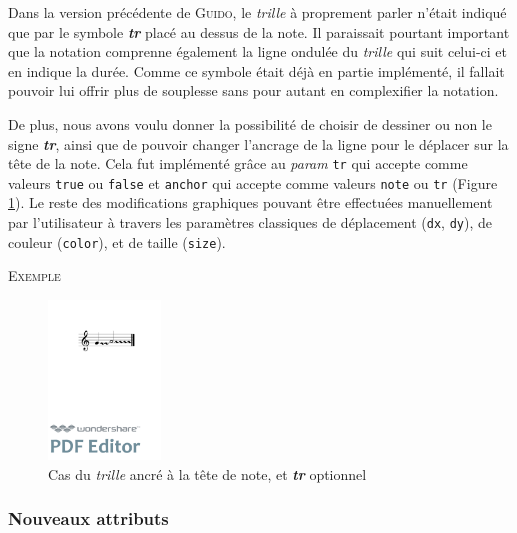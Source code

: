 \documentclass{article}
\newenvironment{gmncode}	{\vspace{-2mm}\small\verbatim}{\endverbatim\vspace{-2mm}}
\newcommand{\guido}			{\textsc{Guido}}
\newcommand{\code}[1]		{{\small \texttt{#1}}}
\newcommand{\exemple}		{\vspace{2mm}\hspace*{-6mm}\textsc{Exemple}}
\begin{document}
Dans la version précédente de \guido{}, le \emph{trille} à proprement parler n'était indiqué que par le symbole \textit{\textbf{tr}} placé au dessus de la note. Il paraissait pourtant important que la notation comprenne également la ligne ondulée du \emph{trille} qui suit celui-ci et en indique la durée. Comme ce symbole était déjà en partie implémenté, il fallait pouvoir lui offrir plus de souplesse sans pour autant en complexifier la notation.


De plus, nous avons voulu donner la possibilité de choisir de dessiner ou non le signe \textit{\textbf{tr}}, ainsi que de pouvoir changer l'ancrage de la ligne pour le déplacer sur la tête de la note. Cela fut implémenté grâce au \emph{param} \code{tr} qui accepte comme valeurs \code{true} ou \code{false} et \code{anchor} qui accepte comme valeurs \code{note} ou \code{tr} (Figure \ref{fig:trillanchor}). Le reste des modifications graphiques pouvant être effectuées manuellement par l'utilisateur à travers les paramètres classiques de déplacement (\code{dx}, \code{dy}), de couleur (\code{color}), et de taille (\code{size}).

\exemple
\begin{figure}[h]
\centering
\begin{gmncode}
[ \trill<tr="false", anchor="note">
( {g} {a/2} ) ]
\end{gmncode}
\includegraphics[width=30mm]{img/trillanchor.pdf}
\caption{Cas du \emph{trille} ancré à la tête de note, et \textit{\textbf{tr}} optionnel}
\label{fig:trillanchor}
\end{figure}

\subsubsection{Nouveaux attributs}\label{subsubsec:attributs}
\end{document}

